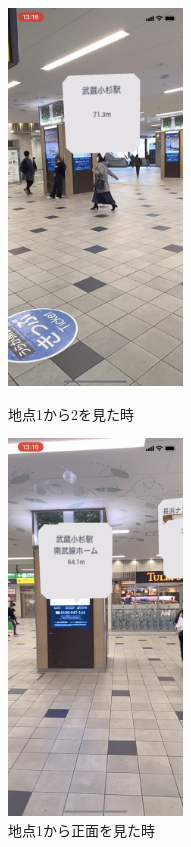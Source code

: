 \begin{figure}[h]
  \begin{minipage}{0.5\hsize}
    \centering
    \includegraphics[height=100mm]{images/musako_tokyu_ar1.png}
    \caption{地点\textcircled{\scriptsize{1}}から\textcircled{\scriptsize{2}}を見た時} \label{fig:musako_tokyu_ar1}
  \end{minipage}
  \begin{minipage}{0.5\hsize}
    \centering
    \includegraphics[height=100mm]{images/musako_tokyu_ar2.png}
    \caption{地点\textcircled{\scriptsize{1}}から正面を見た時} \label{fig:musako_tokyu_ar2}
  \end{minipage}
\end{figure}

